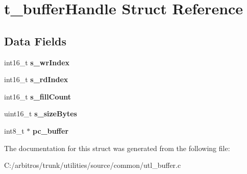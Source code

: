 \hypertarget{structt__buffer_handle}{\section{t\-\_\-buffer\-Handle Struct Reference}
\label{structt__buffer_handle}
}
\subsection*{Data Fields}
\begin{DoxyCompactItemize}
\item 
\hypertarget{structt__buffer_handle_a6741870caf9385528b6cc1783d09c355}{int16\-\_\-t {\bfseries s\-\_\-wr\-Index}}\label{structt__buffer_handle_a6741870caf9385528b6cc1783d09c355}

\item 
\hypertarget{structt__buffer_handle_a9cd61a0c9822803598f10965ba2437f7}{int16\-\_\-t {\bfseries s\-\_\-rd\-Index}}\label{structt__buffer_handle_a9cd61a0c9822803598f10965ba2437f7}

\item 
\hypertarget{structt__buffer_handle_aee0d3a41a9ff196c45450679f40f71a0}{int16\-\_\-t {\bfseries s\-\_\-fill\-Count}}\label{structt__buffer_handle_aee0d3a41a9ff196c45450679f40f71a0}

\item 
\hypertarget{structt__buffer_handle_a0550159437736c023c9301562223043c}{uint16\-\_\-t {\bfseries s\-\_\-size\-Bytes}}\label{structt__buffer_handle_a0550159437736c023c9301562223043c}

\item 
\hypertarget{structt__buffer_handle_a3fa52699622cd2b4c13e1d546970b25f}{int8\-\_\-t $\ast$ {\bfseries pc\-\_\-buffer}}\label{structt__buffer_handle_a3fa52699622cd2b4c13e1d546970b25f}

\end{DoxyCompactItemize}


The documentation for this struct was generated from the following file\-:\begin{DoxyCompactItemize}
\item 
C\-:/arbitros/trunk/utilities/source/common/utl\-\_\-buffer.\-c\end{DoxyCompactItemize}
